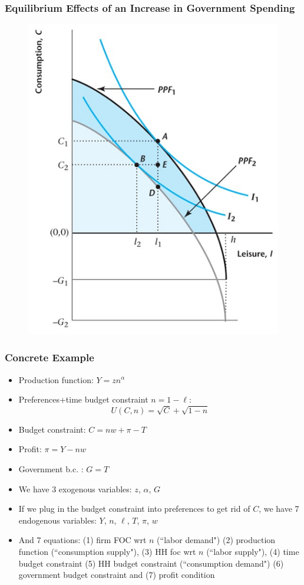 \documentclass{beamer}
\begin{document}
\begin{frame}
\frametitle[alignment=center]{Equilibrium Effects of an Increase in Government Spending}
\begin{figure}
\centering
\includegraphics[scale=0.5]{Figures/W_Fig_5pt6.png}
\end{figure}
\end{frame}

\begin{frame}
\frametitle[alignment=center]{Concrete Example}
\begin{itemize}
\item Production function:  $Y=zn^{\alpha}$
\bigskip
\item Preferences+time budget constraint  $n=1-\ell$:  
$$U(C,n)=\sqrt{C}+\sqrt{1-n}$$
\item Budget constraint:  $C=nw+\pi-T$
\bigskip
\item Profit:  $\pi=Y-nw$
\bigskip
\item Government b.c. : $G=T$
\bigskip
\item We have 3 exogenous variables: $z$, $\alpha$, $G$
\bigskip
\item If we plug in the budget constraint into preferences to get rid of $C$, we have 7 endogenous variables: $Y$, $n$, $\ell$, $T$, $\pi$, $w$
\bigskip
\item And 7 equations:  (1) firm FOC wrt $n$ (``labor demand") (2) production function (``consumption supply"), (3) HH foc wrt $n$ (``labor supply"), (4) time budget constraint (5) HH budget constraint (``consumption demand") (6) government budget constraint and (7) profit condition
\end{itemize}
\end{frame}
\end{document}
